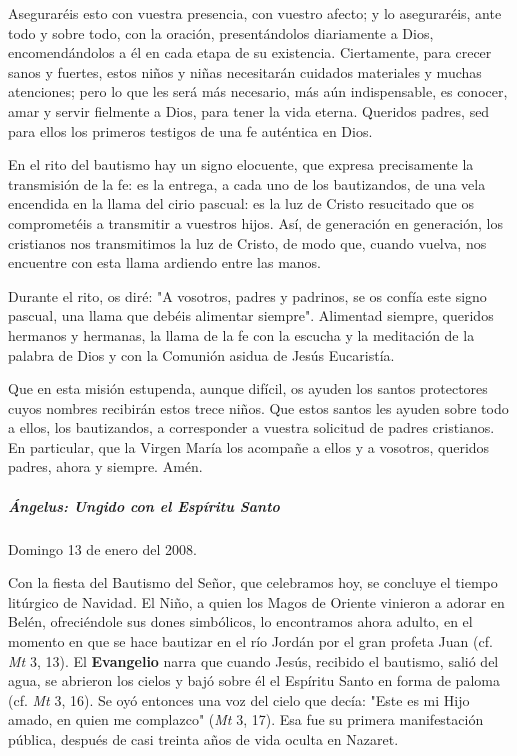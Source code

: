 \documentclass[]{article}
\let\oldsubparagraph\subparagraph
\renewcommand{\subparagraph}[1]{\oldsubparagraph{#1}\mbox{}}
\begin{document}
Aseguraréis esto con vuestra presencia, con vuestro afecto; y lo
aseguraréis, ante todo y sobre todo, con la oración, presentándolos
diariamente a Dios, encomendándolos a él en cada etapa de su existencia.
Ciertamente, para crecer sanos y fuertes, estos niños y niñas
necesitarán cuidados materiales y muchas atenciones; pero lo que les
será más necesario, más aún indispensable, es conocer, amar y servir
fielmente a Dios, para tener la vida eterna. Queridos padres, sed para
ellos los primeros testigos de una fe auténtica en Dios.

En el rito del bautismo hay un signo elocuente, que expresa precisamente
la transmisión de la fe: es la entrega, a cada uno de los bautizandos,
de una vela encendida en la llama del cirio pascual: es la luz de Cristo
resucitado que os comprometéis a transmitir a vuestros hijos. Así, de
generación en generación, los cristianos nos transmitimos la luz de
Cristo, de modo que, cuando vuelva, nos encuentre con esta llama
ardiendo entre las manos.

Durante el rito, os diré: "A vosotros, padres y padrinos, se os confía
este signo pascual, una llama que debéis alimentar siempre". Alimentad
siempre, queridos hermanos y hermanas, la llama de la fe con la escucha
y la meditación de la palabra de Dios y con la Comunión asidua de Jesús
Eucaristía.

Que en esta misión estupenda, aunque difícil, os ayuden los santos
protectores cuyos nombres recibirán estos trece niños. Que estos santos
les ayuden sobre todo a ellos, los bautizandos, a corresponder a vuestra
solicitud de padres cristianos. En particular, que la Virgen María los
acompañe a ellos y a vosotros, queridos padres, ahora y siempre.
Amén.\protect\hypertarget{_Toc448662888}{}{\protect\hypertarget{_Toc448690407}{}{}}

\subparagraph{Ángelus: Ungido con el Espíritu
Santo}\label{uxe1ngelus-ungido-con-el-espuxedritu-santo}

Domingo 13 de enero del 2008.

Con la fiesta del Bautismo del Señor, que celebramos hoy, se concluye el
tiempo litúrgico de Navidad. El Niño, a quien los Magos de Oriente
vinieron a adorar en Belén, ofreciéndole sus dones simbólicos, lo
encontramos ahora adulto, en el momento en que se hace bautizar en el
río Jordán por el gran profeta Juan (cf. \emph{Mt} 3, 13). El
\textbf{Evangelio} narra que cuando Jesús, recibido el bautismo, salió
del agua, se abrieron los cielos y bajó sobre él el Espíritu Santo en
forma de paloma (cf. \emph{Mt} 3, 16). Se oyó entonces una voz del cielo
que decía: "Este es mi Hijo amado, en quien me complazco" (\emph{Mt} 3,
17). Esa fue su primera manifestación pública, después de casi treinta
años de vida oculta en Nazaret.
\end{document}
